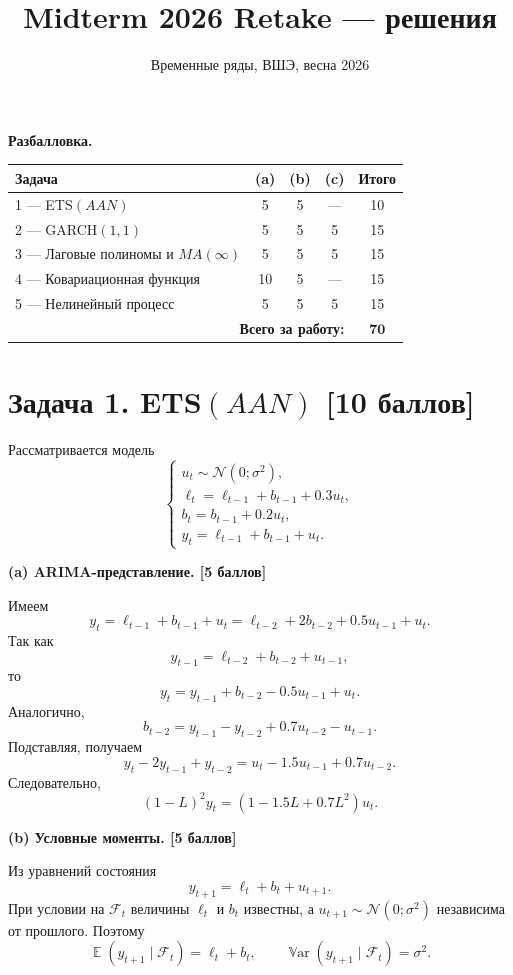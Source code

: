 \documentclass[12pt]{article}
\title{Midterm 2026 Retake --- решения}
\author{Временные ряды, ВШЭ, весна 2026}
\date{}
\DeclareMathOperator{\Var}{\mathbb{V}ar}
\DeclareMathOperator{\E}{\mathbb{E}}
\newcommand \cN{\mathcal{N}}
\newcommand{\cF}{\mathcal{F}}
\newcommand{\step}[1]{\medskip\noindent\textbf{#1}\par\nobreak\vspace{2pt}}
\begin{document}
\maketitle

\begin{center}
\textbf{Разбалловка.}\\[4pt]
\begin{tabular}{@{}l|ccc|c@{}}
\toprule
Задача & (a) & (b) & (c) & \textbf{Итого} \\
\midrule
1 --- ETS$(AAN)$                          & 5 & 5 & --- & 10 \\
2 --- GARCH$(1,1)$                       & 5 & 5 & 5   & 15 \\
3 --- Лаговые полиномы и $MA(\infty)$    & 5 & 5 & 5   & 15 \\
4 --- Ковариационная функция             & 10 & 5 & --- & 15 \\
5 --- Нелинейный процесс                 & 5 & 5 & 5   & 15 \\
\midrule
\multicolumn{4}{r|}{\textbf{Всего за работу:}} & \(\mathbf{70}\) \\
\bottomrule
\end{tabular}
\end{center}

\section*{Задача 1. ETS$(AAN)$ \hfill [10 баллов]}

Рассматривается модель
\[
\begin{cases}
u_t \sim \cN(0;\sigma^2),\\
\ell_t = \ell_{t-1} + b_{t-1} + 0.3u_t,\\
b_t = b_{t-1} + 0.2u_t,\\
y_t = \ell_{t-1} + b_{t-1} + u_t.
\end{cases}
\]

\step{(a) ARIMA-представление. \hfill [5 баллов]}
Имеем
\[
y_t=\ell_{t-1}+b_{t-1}+u_t
=\ell_{t-2}+2b_{t-2}+0.5u_{t-1}+u_t.
\]
Так как
\[
y_{t-1}=\ell_{t-2}+b_{t-2}+u_{t-1},
\]
то
\[
y_t=y_{t-1}+b_{t-2}-0.5u_{t-1}+u_t.
\]
Аналогично,
\[
b_{t-2}=y_{t-1}-y_{t-2}+0.7u_{t-2}-u_{t-1}.
\]
Подставляя, получаем
\[
y_t-2y_{t-1}+y_{t-2}=u_t-1.5u_{t-1}+0.7u_{t-2}.
\]
Следовательно,
\[
\boxed{(1-L)^2y_t=(1-1.5L+0.7L^2)u_t.}
\]

\step{(b) Условные моменты. \hfill [5 баллов]}
Из уравнений состояния
\[
y_{t+1}=\ell_t+b_t+u_{t+1}.
\]
При условии на $\cF_t$ величины $\ell_t$ и $b_t$ известны, а $u_{t+1}\sim\cN(0;\sigma^2)$ независима от прошлого. Поэтому
\[
\boxed{\E(y_{t+1}\mid\cF_t)=\ell_t+b_t, \qquad \Var(y_{t+1}\mid\cF_t)=\sigma^2.}
\]
\end{document}
